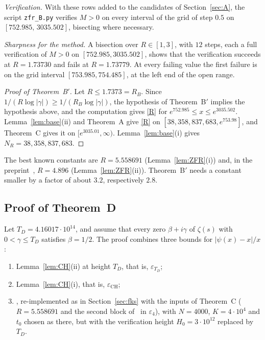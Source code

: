\documentclass{amsart}
\theoremstyle{definition}
\theoremstyle{remark}
\theoremstyle{plain}
\numberwithin{equation}{section}
\newcommand{\eps}{\varepsilon}
\newcommand{\NN}{38{,}358{,}837{,}683}
\newcommand{\epsCH}{\eps_{\mathrm{CH}}}
\newcommand{\TDuse}{4.16017\cdot10^{14}}
\newcommand{\Bp}{B$'$}
\begin{document}
\emph{Verification.} With these rows added to the candidates of Section~\ref{sec:A}, the script \texttt{zfr\_B.py} verifies $M>0$ on every interval of the grid of step $0.5$ on $[752.985,\,3035.502]$, bisecting where necessary.

\emph{Sharpness for the method.} A bisection over $R\in[1,3]$, with $12$ steps, each a full verification of $M>0$ on $[752.985,3035.502]$, shows that the verification succeeds at $R=1.73730$ and fails at $R=1.73779$. At every failing value the first failure is on the grid interval $[753.985,754.485]$, at the left end of the open range.

\begin{proof}[Proof of Theorem~\Bp]
Let $R\le1.7373=R_B$. Since $1/(R\log|\gamma|)\ge1/(R_B\log|\gamma|)$, the hypothesis of Theorem~\Bp{} implies the hypothesis above, and the computation gives \eqref{R} for $e^{752.985}\le x\le e^{3035.502}$. Lemma~\ref{lem:base}(ii) and Theorem~A give \eqref{R} on $[\NN,\allowbreak e^{753.98}]$, and Theorem~C gives it on $[e^{3035.01},\allowbreak\infty)$. Lemma~\ref{lem:base}(i) gives $N_R=\NN$.
\end{proof}

The best known constants are $R=5.558691$ (Lemma~\ref{lem:ZFR}(i)) and, in the preprint~\cite{BTY26}, $R=4.896$ (Lemma~\ref{lem:ZFR}(ii)). Theorem~\Bp{} needs a constant smaller by a factor of about $3.2$, respectively $2.8$.

\subsection{Proof of Theorem~D}\label{sec:D}

Let $T_D=\TDuse$, and assume that every zero $\beta+i\gamma$ of $\zeta(s)$ with $0<\gamma\le T_D$ satisfies $\beta=1/2$. The proof combines three bounds for $|\psi(x)-x|/x$:
\begin{enumerate}
\item[(D1)] Lemma~\ref{lem:CH}(ii) at height $T_D$, that is, $\eps_{T_D}$;
\item[(D2)] Lemma~\ref{lem:CH}(i), that is, $\epsCH$;
\item[(D3)] \cite[Thm.~1.1]{FKS23}, re-implemented as in Section~\ref{sec:fks} with the inputs of Theorem~C ($R=5.558691$ and the second block of~\cite[Table~7]{FKS23} in $\eps_4$), with $N=4000$, $K=4\cdot10^4$ and $t_0$ chosen as there, but with the verification height $H_0=3\cdot10^{12}$ replaced by $T_D$.
\end{enumerate}
\end{document}
